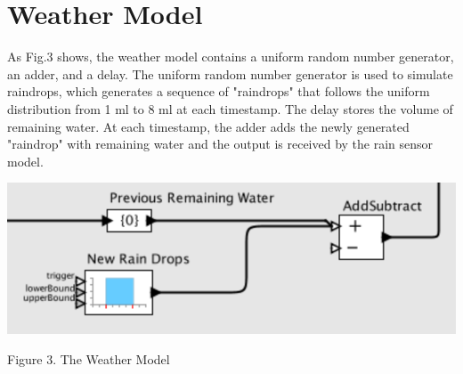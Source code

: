 \section{Weather Model}
As Fig.3 shows, the weather model contains a uniform random number generator, an adder, and a delay. The uniform random number generator is used to simulate raindrops, which generates a sequence of "raindrops" that follows the uniform distribution from 1 ml to 8 ml at each timestamp. The delay stores the volume of remaining water. At each timestamp, the adder adds the newly generated "raindrop" with remaining water and the output is received by the rain sensor model.
\begin{center}
\includegraphics[width=13.5cm]{fig3.png}
\end{center}
\begin{center}
\small{Figure 3. The Weather Model}
\label{weather}
\end{center}